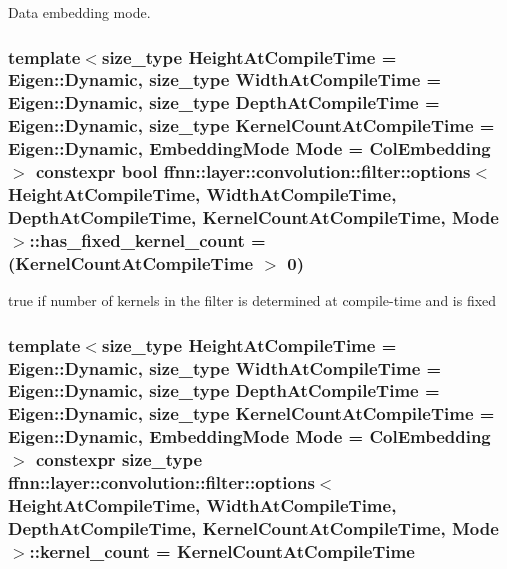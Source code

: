 Data embedding mode. 

\hypertarget{structffnn_1_1layer_1_1convolution_1_1filter_1_1options_afe85a502882816dd562acd349c96b30e}{
\subsubsection[{has\-\_\-fixed\-\_\-kernel\-\_\-count}]{\setlength{\rightskip}{0pt plus 5cm}template$<$size\-\_\-type Height\-At\-Compile\-Time = Eigen\-::\-Dynamic, size\-\_\-type Width\-At\-Compile\-Time = Eigen\-::\-Dynamic, size\-\_\-type Depth\-At\-Compile\-Time = Eigen\-::\-Dynamic, size\-\_\-type Kernel\-Count\-At\-Compile\-Time = Eigen\-::\-Dynamic, Embedding\-Mode Mode = Col\-Embedding$>$ constexpr bool {\bf ffnn\-::layer\-::convolution\-::filter\-::options}$<$ Height\-At\-Compile\-Time, Width\-At\-Compile\-Time, Depth\-At\-Compile\-Time, Kernel\-Count\-At\-Compile\-Time, Mode $>$\-::has\-\_\-fixed\-\_\-kernel\-\_\-count = (Kernel\-Count\-At\-Compile\-Time $>$ 0)\hspace{0.3cm}{\ttfamily [static]}}}\label{structffnn_1_1layer_1_1convolution_1_1filter_1_1options_afe85a502882816dd562acd349c96b30e}


{\ttfamily true} if number of kernels in the filter is determined at compile-\/time and is fixed 

\hypertarget{structffnn_1_1layer_1_1convolution_1_1filter_1_1options_a615d2970fd2d4ded6bbacff86d6f71e4}{
\subsubsection[{kernel\-\_\-count}]{\setlength{\rightskip}{0pt plus 5cm}template$<$size\-\_\-type Height\-At\-Compile\-Time = Eigen\-::\-Dynamic, size\-\_\-type Width\-At\-Compile\-Time = Eigen\-::\-Dynamic, size\-\_\-type Depth\-At\-Compile\-Time = Eigen\-::\-Dynamic, size\-\_\-type Kernel\-Count\-At\-Compile\-Time = Eigen\-::\-Dynamic, Embedding\-Mode Mode = Col\-Embedding$>$ constexpr {\bf size\-\_\-type} {\bf ffnn\-::layer\-::convolution\-::filter\-::options}$<$ Height\-At\-Compile\-Time, Width\-At\-Compile\-Time, Depth\-At\-Compile\-Time, Kernel\-Count\-At\-Compile\-Time, Mode $>$\-::kernel\-\_\-count = Kernel\-Count\-At\-Compile\-Time\hspace{0.3cm}{\ttfamily [static]}}}\label{structffnn_1_1layer_1_1convolution_1_1filter_1_1options_a615d2970fd2d4ded6bbacff86d6f71e4}


